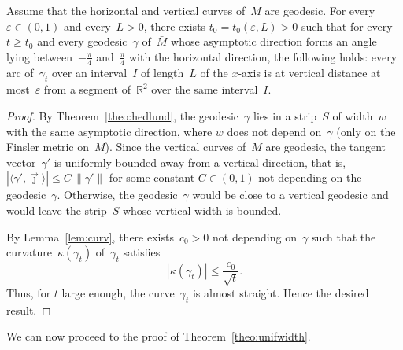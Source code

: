 \documentclass[AHL,Unicode,longabstracts,published]{cedram}
\newcommand{\R}{\mathbb{R}}
\begin{document}
\begin{lemm}\label{lem:L'}
Assume that the horizontal and vertical curves of~$M$ are geodesic. For every $\varepsilon \in (0,1)$ and every~$L>0$, there exists $t_0=t_0(\varepsilon,L)>0$ such that for every $t \geq t_0$ and every geodesic~$\gamma$ of~$\bar{M}$ whose asymptotic direction forms an angle lying between~$-\frac{\pi}{4}$ and~$\frac{\pi}{4}$ with the horizontal direction, the following holds: every arc of~$\gamma_t$ over an interval~$I$ of length~$L$ of the $x$-axis is at vertical distance at most~$\varepsilon$ from a segment of~$\R^2$ over the same interval~$I$.
\end{lemm}

\begin{proof}
By Theorem~\ref{theo:hedlund}, the geodesic~$\gamma$ lies in a strip~$S$ of width~$w$ with the same asymptotic direction, where $w$ does not depend on~$\gamma$ (only on the Finsler metric on~$M$). Since the vertical curves of~$\bar{M}$ are geodesic, the tangent vector~$\gamma'$ is uniformly bounded away from a vertical direction, that is, $|\langle \gamma',\vec{\jmath} \rangle| \leq C \, \lVert \gamma' \rVert$ for some constant $C \in (0,1)$ not depending on the geodesic~$\gamma$. Otherwise, the geodesic~$\gamma$ would be close to a vertical geodesic and would leave the strip~$S$ whose vertical width is bounded.

By Lemma~\ref{lem:curv}, there exists~$c_0>0$ not depending on~$\gamma$ such that the curvature~$\kappa(\gamma_t)$ of~$\gamma_t$ satisfies
\[
|\kappa(\gamma_t)| \leq \frac{c_0}{\sqrt{t}}.
\]
Thus, for $t$ large enough, the curve~$\gamma_t$ is almost straight. Hence the desired result.
\end{proof}

We can now proceed to the proof of Theorem~\ref{theo:unifwidth}.
\end{document}

